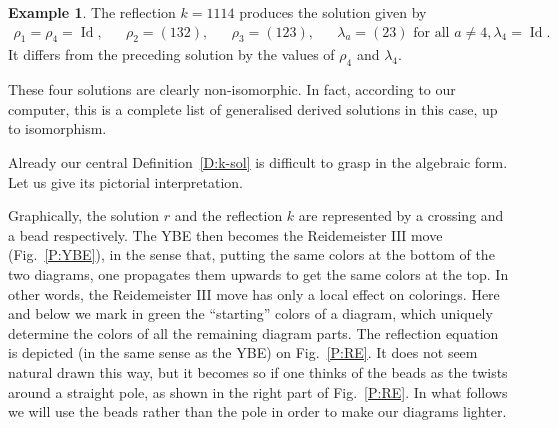 \documentclass{amsart}
\newcommand{\Id}{\operatorname{Id}}
\theoremstyle{plain}
\theoremstyle{definition}
\newtheorem{exa}[thm]{Example}
\theoremstyle{remark}
\begin{document}
\begin{exa}
\noindent The reflection $k=1114$ produces the solution given by 
\begin{align*}
	\rho_1=\rho_4=\Id, && \rho_2=(132), && \rho_3=(123), && \lambda_a=(23) \text{ for all } a \neq 4, \lambda_4=\Id.
\end{align*}
It differs from the preceding solution by the values of $\rho_4$ and $\lambda_4$.

\noindent These four solutions are clearly non-isomorphic. In fact, according to our computer, this is a complete list of generalised derived solutions in this case, up to isomorphism.			
\end{exa}

Already our central Definition~\ref{D:k-sol} is difficult to grasp in the algebraic form. Let us give its pictorial interpretation.

Graphically, the solution $r$ and the reflection $k$ are represented by a crossing and a bead respectively. The YBE then becomes the Reidemeister $\mathrm{III}$ move (Fig.~\ref{P:YBE}), in the sense that, putting the same colors at the bottom of the two diagrams, one propagates them upwards to get the same colors at the top. In other words, the Reidemeister $\mathrm{III}$ move has only a local effect on colorings. Here and below we mark in green the ``starting'' colors of a diagram, which uniquely determine the colors of all the remaining diagram parts. The reflection equation is depicted (in the same sense as the YBE) on Fig.~\ref{P:RE}. It does not seem natural drawn this way, but it becomes so if one thinks of the beads as the twists around a straight pole, as shown in the right part of Fig.~\ref{P:RE}. In what follows we will use the beads rather than the pole in order to make our diagrams lighter.
\end{document}
